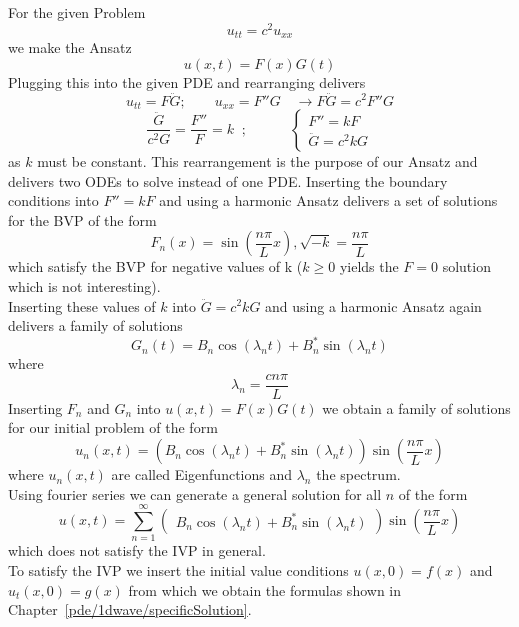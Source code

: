 \begin{examplesection}
    For the given Problem
    \[ u_{tt}=c^2u_{xx}\]
    we make the Ansatz
    \[u(x,t)=F(x)G(t)\]
    Plugging this into the given PDE and rearranging delivers
    \[u_{tt}=F\ddot{G};\qquad u_{xx}=F''G \quad \rightarrow F\ddot{G}=c^2F''G\]
    \[\frac{\ddot{G}}{c^2G}=\frac{F''}{F}=k\;\; ;\qquad\quad\begin{cases} F''=kF \\
            \ddot{G}=c^2kG
        \end{cases}\]
    as $k$ must be constant. This rearrangement is the purpose of our Ansatz and delivers two ODEs to solve instead of one PDE.
    Inserting the boundary conditions into $F''=kF$ and using a harmonic Ansatz delivers a set of solutions for the BVP of the form
    \[F_n (x)=\sin{\left( \frac{n \pi}{L} x \right) }, \sqrt{-k}=\frac{n \pi}{L}\]
    which satisfy the BVP for negative values of k ($k \ge 0$ yields the $F=0$ solution which is not interesting).\\
    Inserting these values of $k$ into $\ddot{G}=c^2kG$ and using a harmonic Ansatz again delivers a family of solutions
    \[G_n (t) =  B_n \cos{(\lambda_{n} t)} + B_n^* \sin{(\lambda_{n}t)}\]
    where
    \[ \lambda_{n} = \frac{c n \pi}{L} \]
    Inserting $F_n$ and $G_n$ into $u(x,t)=F(x)G(t)$ we obtain a family of solutions for our initial problem of the form
    \[u_n (x, t) = (B_n \cos{(\lambda_{n} t)} + B_n^* \sin{(\lambda_{n}t)})\sin{\left( \frac{n \pi}{L} x \right) } \]
    where $u_n (x, t)$ are called Eigenfunctions and $\lambda_n$ the spectrum.\\
    Using fourier series we can generate a general solution for all $n$ of the form
    \[u(x,t)=\sum\limits_{n=1}^{\infty}\begin{pmatrix}
            B_n \cos(\lambda _n t)+B_n^* \sin(\lambda_n t)
        \end{pmatrix} \sin\left(\frac{n \pi}{L}x \right) \]
    which does not satisfy the IVP in general.\\
    To satisfy the IVP we insert the initial value conditions $u(x,0)=f(x)$ and $u_t(x,0)=g(x)$ from which we obtain the formulas shown in Chapter~\ref{pde/1dwave/specificSolution}.
\end{examplesection}

